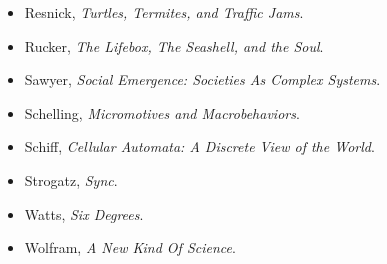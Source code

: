 \documentclass[12pt]{book}
\theoremstyle{exercise}
\newcommand\blankpage{%
    \null
    \thispagestyle{empty}%
    \addtocounter{page}{-1}%
    \newpage}
\begin{document}
\begin{itemize}
\item Resnick, {\it  Turtles, Termites, and Traffic Jams}.

\item Rucker, {\it  The Lifebox, The Seashell, and the Soul}.

\item Sawyer, {\it  Social Emergence: Societies As Complex Systems}.

\item Schelling, {\it  Micromotives and Macrobehaviors}.

\item Schiff, {\it  Cellular Automata: A Discrete View of the World}.

\item Strogatz, {\it  Sync}.

\item Watts, {\it  Six Degrees}.

\item Wolfram, {\it  A New Kind Of Science}.

\end{itemize}



\backmatter
\printindex

\afterpage{\blankpage}
\end{document}
